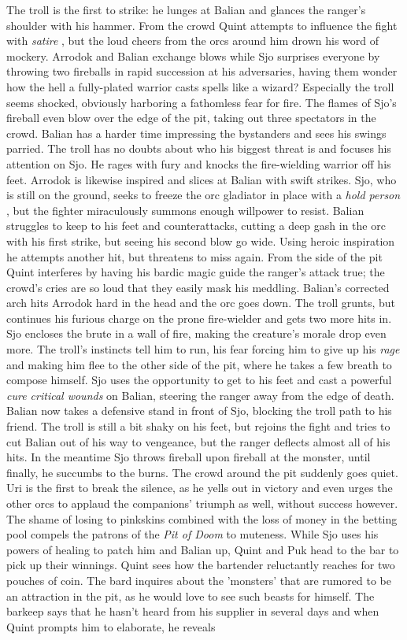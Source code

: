 The troll is the first to strike: he lunges at Balian and glances the ranger's shoulder with his hammer. From the crowd Quint attempts to influence the fight with {\itshape satire} , but the loud cheers from the orcs around him drown his word of mockery. Arrodok and Balian exchange blows while Sjo surprises everyone by throwing two fireballs in rapid succession at his adversaries, having them wonder how the hell a fully-plated warrior casts spells like a wizard? Especially the troll seems shocked, obviously harboring a fathomless fear for fire. The flames of Sjo's fireball even blow over the edge of the pit, taking out three spectators in the crowd. Balian has a harder time impressing the bystanders and sees his swings parried. The troll has no doubts about who his biggest threat is and focuses his attention on Sjo. He rages with fury and knocks the fire-wielding warrior off his feet. Arrodok is likewise inspired and slices at Balian with swift strikes. Sjo, who is still on the ground, seeks to freeze the orc gladiator in place with a  {\itshape hold person} , but the fighter miraculously summons enough willpower to resist. Balian struggles to keep to his feet and counterattacks, cutting a deep gash in the orc with his first strike, but seeing his second blow go wide. Using heroic inspiration he attempts another hit, but threatens to miss again. From the side of the pit Quint interferes by having his bardic magic guide the ranger's attack true; the crowd's cries are so loud that they easily mask his meddling. Balian's corrected arch hits Arrodok hard in the head and the orc goes down. The troll grunts, but continues his furious charge on the prone fire-wielder and gets two more hits in. Sjo encloses the brute in a wall of fire, making the creature's morale drop even more. The troll's instincts tell him to run, his fear forcing him to give up his  {\itshape rage} and making him flee to the other side of the pit, where he takes a few breath to compose himself. Sjo uses the opportunity to get to his feet and cast a powerful  {\itshape cure critical wounds} on Balian, steering the ranger away from the edge of death. Balian now takes a defensive stand in front of Sjo, blocking the troll path to his friend. The troll is still a bit shaky on his feet, but rejoins the fight and tries to cut Balian out of his way to vengeance, but the ranger deflects almost all of his hits. In the meantime Sjo throws fireball upon fireball at the monster, until finally, he succumbs to the burns. The crowd around the pit suddenly goes quiet. Uri is the first to break the silence, as he yells out in victory and even urges the other orcs to applaud the companions' triumph as well, without success however. The shame of losing to pinkskins combined with the loss of money in the betting pool compels the patrons of the  {\itshape Pit of Doom} to muteness. While Sjo uses his powers of healing to patch him and Balian up, Quint and Puk head to the bar to pick up their winnings. Quint sees how the bartender reluctantly reaches for two pouches of coin. The bard inquires about the 'monsters' that are rumored to be an attraction in the pit, as he would love to see such beasts for himself. The barkeep says that he hasn't heard from his supplier in several days and when Quint prompts him to elaborate, he reveals 